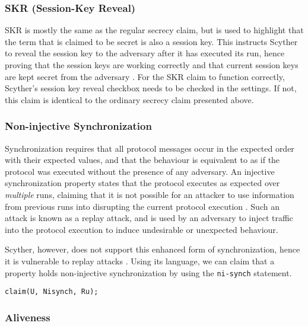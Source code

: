 \subsubsection{SKR (Session-Key Reveal)}

SKR is mostly the same as the regular secrecy claim, but is used to highlight that the term that is claimed to be secret is also a session key. This instructs Scyther to reveal the session key to the adversary after it has executed its run, hence proving that the session keys are working correctly and that current session keys are kept secret from the adversary \cite{scyther-manual}. For the SKR claim to function correctly, Scyther's session key reveal checkbox needs to be checked in the settings. If not, this claim is identical to the ordinary secrecy claim presented above.


\subsubsection{Non-injective Synchronization}

Synchronization requires that all protocol messages occur in the expected order with their expected values, and that the behaviour is equivalent to as if the protocol was executed without the presence of any adversary. An injective synchronization property states that the protocol executes as expected over \emph{multiple} runs, claiming that it is not possible for an attacker to use information from previous runs into disrupting the current protocol execution \cite{cremers2005operational}. Such an attack is known as a replay attack, and is used by an adversary to inject traffic into the protocol execution to induce undesirable or unexpected behaviour.

Scyther, however, does not support this enhanced form of synchronization, hence it is vulnerable to replay attacks \cite{scyther-manual}. Using its language, we can claim that a property holds non-injective synchronization by using the \texttt{ni-synch} statement.\newline


\begin{lstlisting}
claim(U, Nisynch, Ru);

\end{lstlisting}


\subsubsection{Aliveness}

